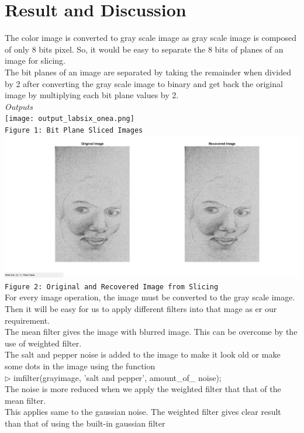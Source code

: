 \documentclass[12pt]{article}
\begin{document}
\section{Result and Discussion}
The color image is converted to gray scale image as gray scale image is composed of only 8 bits pixel. So, it would be easy to separate the 8 bits of planes of an image for slicing.\\
The bit planes of an image are separated by taking the remainder when divided by 2 after converting the gray scale image to binary and get back the original image by multiplying each bit plane values by 2.\\
\emph{Outputs}\\
\texttt{[image: output\_labsix\_onea.png]}\\
\texttt{Figure 1:  Bit Plane Sliced Images}\\
\includegraphics[scale = 0.4]{output_labsix_two.png}\\
\texttt{Figure 2:  Original and Recovered Image from Slicing }\\
For every image operation, the image must be converted to the gray scale image. Then it will be easy for us to apply different filters into that mage as er our requirement.\\
The mean filter gives the image with blurred image. This can be overcome by the use of weighted filter.\\
The salt and pepper noise is added to the image to make it look old or make some dots in the image using the function\\
$\rhd$ \quad imfilter(grayimage, 'salt and pepper', amount\_of\_ noise);\\
The noise is more reduced when we apply the weighted filter that that of the mean filter.\\
This applies same to the gaussian noise. The weighted filter gives clear result than that of using the built-in gaussian filter\\ 
\end{document}
